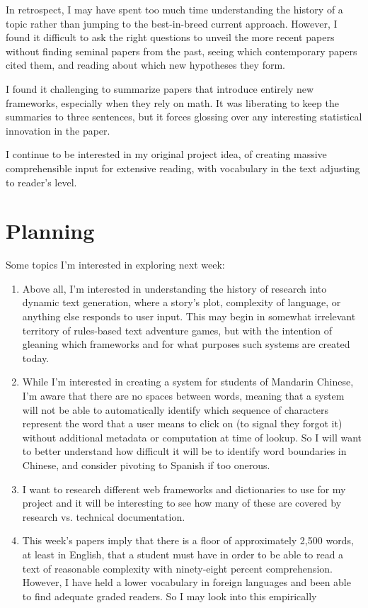 \documentclass[
	letterpaper, %
]{jdf}
\begin{document}
In retrospect, I may have spent too much time understanding the history of a topic rather than jumping to the best-in-breed current approach. However, I found it difficult to ask the right questions to unveil the more recent papers without finding seminal papers from the past, seeing which contemporary papers cited them, and reading about which new hypotheses they form.

I found it challenging to summarize papers that introduce entirely new frameworks, especially when they rely on math. It was liberating to keep the summaries to three sentences, but it forces glossing over any interesting statistical innovation in the paper.

I continue to be interested in my original project idea, of creating massive comprehensible input for extensive reading, with vocabulary in the text adjusting to reader's level.

\section{Planning}
Some topics I'm interested in exploring next week:
\begin{enumerate}
    \item Above all, I'm interested in understanding the history of research into dynamic text generation, where a story's plot, complexity of language, or anything else responds to user input. This may begin in somewhat irrelevant territory of rules-based text adventure games, but with the intention of gleaning which frameworks and for what purposes such systems are created today.
    \item While I'm interested in creating a system for students of Mandarin Chinese, I'm aware that there are no spaces between words, meaning that a system will not be able to automatically identify which sequence of characters represent the word that a user means to click on (to signal they forgot it) without additional metadata or computation at time of lookup. So I will want to better understand how difficult it will be to identify word boundaries in Chinese, and consider pivoting to Spanish if too onerous.
    \item I want to research different web frameworks and dictionaries to use for my project and it will be interesting to see how many of these are covered by research vs. technical documentation. 
    \item This week's papers imply that there is a floor of approximately 2,500 words, at least in English, that a student must have in order to be able to read a text of reasonable complexity with ninety-eight percent comprehension. However, I have held a lower vocabulary in foreign languages and been able to find adequate graded readers. So I may look into this empirically
\end{enumerate}

\printbibliography{}
\end{document}
